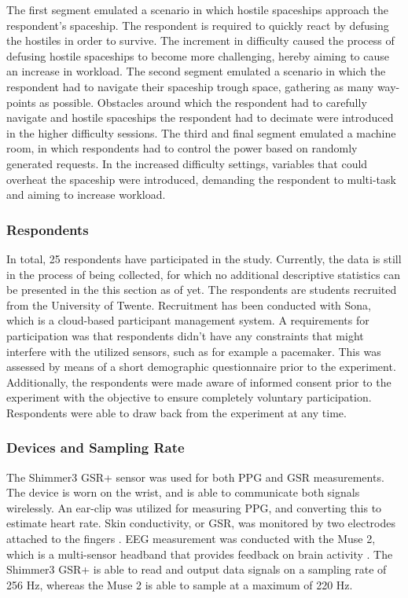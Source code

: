 \documentclass[12pt]{article}
\begin{document}
The first segment emulated a scenario in which hostile spaceships approach the respondent's spaceship. The respondent is required to quickly react by defusing the hostiles in order to survive. The increment in difficulty caused the process of defusing hostile spaceships to become more challenging, hereby aiming to cause an increase in workload. The second segment emulated a scenario in which the respondent had to navigate their spaceship trough space, gathering as many way-points as possible. Obstacles around which the respondent had to carefully navigate and hostile spaceships the respondent had to decimate were introduced in the higher difficulty sessions. The third and final segment emulated a machine room, in which respondents had to control the power based on randomly generated requests. In the increased difficulty settings, variables that could overheat the spaceship were introduced, demanding the respondent to multi-task and aiming to increase workload.

\subsubsection{Respondents}
In total, 25 respondents have participated in the study. Currently, the data is still in the process of being collected, for which no additional descriptive statistics can be presented in the this section as of yet. The respondents are students recruited from the University of Twente. Recruitment has been conducted with Sona, which is a cloud-based participant management system. A requirements for participation was that respondents didn't have any constraints that might interfere with the utilized sensors, such as for example a pacemaker. This was assessed by means of a short demographic questionnaire prior to the experiment. Additionally, the respondents were made aware of informed consent prior to the experiment with the objective to ensure completely voluntary participation. Respondents were able to draw back from the experiment at any time. 

\subsubsection{Devices and Sampling Rate}
The Shimmer3 GSR+ sensor was used for both PPG and GSR measurements. The device is worn on the wrist, and is able to communicate both signals wirelessly. An ear-clip was utilized for measuring PPG, and converting this to estimate heart rate. Skin conductivity, or GSR, was monitored by two electrodes attached to the fingers \cite{shimmer}. EEG measurement was conducted with the Muse 2, which is a multi-sensor headband that provides feedback on brain activity \cite{muse}. The Shimmer3 GSR+ is able to read and output data signals on a sampling rate of 256 Hz, whereas the Muse 2 is able to sample at a maximum of 220 Hz. 
\end{document}
